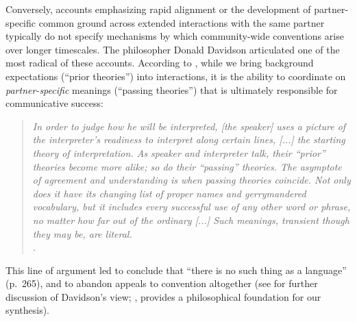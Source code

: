 Conversely, accounts emphasizing rapid alignment \cite{pickering2004toward} or the development of partner-specific common ground \cite{ClarkMarshall1981,ClarkWilkesGibbs86_ReferringCollaborative} across extended interactions with the same partner typically do not specify mechanisms by which community-wide conventions arise over longer timescales.
The philosopher Donald Davidson articulated one of the most radical of these accounts.
According to , while we bring background expectations (``prior theories'') into interactions, it is the ability to coordinate on \emph{partner-specific} meanings (``passing theories'') that is ultimately responsible for communicative success: 
\begin{quote}
\footnotesize\emph{In order to judge how he will be interpreted, [the speaker] uses a picture of the interpreter’s readiness to interpret along certain lines, [...] the starting theory of interpretation. %
As speaker and interpreter talk, their ``prior'' theories become more alike; so do their ``passing'' theories. 
The asymptote of agreement and understanding is when passing theories coincide. 
Not only does it have its changing list of proper names and gerrymandered vocabulary, but it includes every successful use of any other word or phrase, no matter how far out of the ordinary [...] 
Such meanings, transient though they may be, are literal. \\\cite[p.~261]{davidson_nice_1986}.}
\end{quote}
This line of argument led  to conclude that ``there is no such thing as a language'' (p.~265), and to abandon appeals to convention altogether (see  for further discussion of Davidson's view; , provides a philosophical foundation for our synthesis).%


